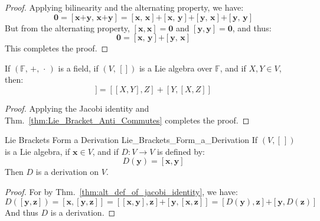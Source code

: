 \documentclass[crop=false,class=article]{standalone}                           %
\begin{document}
        \begin{proof}
            Applying bilinearity and the alternating property, we have:
            \begin{equation}
                \mathbf{0}=[\mathbf{x}\boldsymbol{+}\mathbf{y},\,
                            \mathbf{x}\boldsymbol{+}\mathbf{y}]
                          =[\mathbf{x},\,\mathbf{x}]\boldsymbol{+}
                           [\mathbf{x},\,\mathbf{y}]\boldsymbol{+}
                           [\mathbf{y},\,\mathbf{x}]\boldsymbol{+}
                           [\mathbf{y},\,\mathbf{y}]
            \end{equation}
            But from the alternating property,
            $[\mathbf{x},\mathbf{x}]=\mathbf{0}$ and
            $[\mathbf{y},\mathbf{y}]=\mathbf{0}$, and thus:
            \begin{equation}
                \mathbf{0}=[\mathbf{x},\,\mathbf{y}]\boldsymbol{+}
                           [\mathbf{y},\,\mathbf{x}]
            \end{equation}
            This completes the proof.
        \end{proof}
        \begin{theorem}
            \label{thm:alt_def_of_jacobi_identity}
            If $(\mathbb{F},\,+,\,\cdot\,)$ is a field, if $(V,\,[])$ is a
            Lie algebra over $\mathbb{F}$, and if $X,Y\in{V}$, then:
            \begin{equation}
                [X,[Y,Z]]=[[X,Y],Z]+[Y,[X,Z]]
            \end{equation}
        \end{theorem}
        \begin{proof}
            Applying the Jacobi identity and
            Thm.~\ref{thm:Lie_Bracket_Anti_Commutes} completes the proof.
        \end{proof}
        \begin{ltheorem}{Lie Brackets Form a Derivation}
                        {Lie_Brackets_Form_a_Derivation}
            If $(V,[\,])$ is a Lie algebra, if $\mathbf{x}\in{V}$, and if
            $D:V\rightarrow{V}$ is defined by:
            \begin{equation}
                D(\mathbf{y})=[\mathbf{x},\mathbf{y}]
            \end{equation}
            Then $D$ is a derivation on $V$.
        \end{ltheorem}
        \begin{proof}
            For by Thm.~\ref{thm:alt_def_of_jacobi_identity}, we have:
            \begin{equation}
                D([\mathbf{y},\mathbf{z}])=
                [\mathbf{x},[\mathbf{y},\mathbf{z}]]=
                [[\mathbf{x},\mathbf{y}],\mathbf{z}]\boldsymbol{+}
                [\mathbf{y},[\mathbf{x},\mathbf{z}]]=
                [D(\mathbf{y}),\mathbf{z}]\boldsymbol{+}
                [\mathbf{y},D(\mathbf{z})]
            \end{equation}
            And thus $D$ is a derivation.
        \end{proof}
\end{document}

